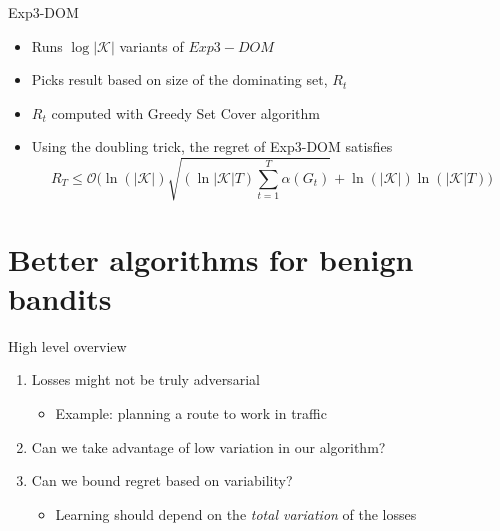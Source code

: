 \documentclass{beamer}
\begin{document}
\begin{frame}{Exp3-DOM}
  \begin{itemize}
    \item Runs $\log |\mathcal{K}|$ variants of $Exp3-DOM$
    \item Picks result based on size of the dominating set, $R_t$
    \item $R_t$ computed with Greedy Set Cover algorithm 
    \item Using the doubling trick, the regret of Exp3-DOM satisfies 
      $$R_T\leq \mathcal{O}\Bigg(\ln(|\mathcal{K}|)\sqrt{(\ln |\mathcal{K}|T)\sum_{t=1}^T\alpha(G_t)}+\ln(|\mathcal{K}|)\ln (|\mathcal{K}|T)\Bigg)$$
  \end{itemize}
\end{frame}

\section{Better algorithms for benign bandits}
\begin{frame}{High level overview}

  \begin{enumerate}
  \item
    Losses might not be truly adversarial
    \begin{itemize}   
    \item
      Example: planning a route to work in traffic
    \end{itemize}
    \item
      Can we take advantage of low variation in our algorithm?
    \item
       Can we bound regret based on variability?
      \begin{itemize}
        \item
          Learning should depend on the \textit{total variation} of the losses
        \end{itemize}
  \end{enumerate}
\end{frame}
\end{document}

